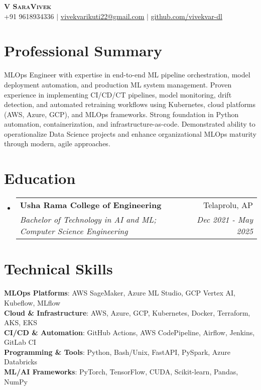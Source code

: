 \documentclass[letterpaper,11pt]{article}
\makeatletter
\newcommand{\resumeSubheading}[4]{
  \vspace{-2pt}\item
    \begin{tabular*}{0.97\textwidth}[t]{l@{\extracolsep{\fill}}r}
      \textbf{#1} & #2 \\
      \textit{\small#3} & \textit{\small #4} \\
    \end{tabular*}\vspace{-7pt}
}
\newcommand{\resumeSubHeadingListStart}{\begin{itemize}[leftmargin=0.15in, label={}]}
\newcommand{\resumeSubHeadingListEnd}{\end{itemize}}
\makeatother
\begin{document}
\begin{center}
    \textbf{\Huge \scshape V SaraVivek} \\ \vspace{1pt}
    \small +91 9618934336 $|$ \href{mailto:vivekvarikuti22@gmail.com}{\underline{vivekvarikuti22@gmail.com}} $|$ 
    \href{https://github.com/vivekvar-dl}{\underline{github.com/vivekvar-dl}}
\end{center}

\section{Professional Summary}
\begin{itemize}[leftmargin=0.15in, label={}]
    \small{\item{
        MLOps Engineer with expertise in end-to-end ML pipeline orchestration, model deployment automation, and production ML system management. Proven experience in implementing CI/CD/CT pipelines, model monitoring, drift detection, and automated retraining workflows using Kubernetes, cloud platforms (AWS, Azure, GCP), and MLOps frameworks. Strong foundation in Python automation, containerization, and infrastructure-as-code. Demonstrated ability to operationalize Data Science projects and enhance organizational MLOps maturity through modern, agile approaches.
    }}
\end{itemize}

\section{Education}
  \resumeSubHeadingListStart
    \resumeSubheading
      {Usha Rama College of Engineering}{Telaprolu, AP}
      {Bachelor of Technology in AI and ML; Computer Science Engineering}{Dec 2021 - May 2025}
  \resumeSubHeadingListEnd

\section{Technical Skills}
 \begin{itemize}[leftmargin=0.15in, label={}]
    \small{\item{
     \textbf{MLOps Platforms}{: AWS SageMaker, Azure ML Studio, GCP Vertex AI, Kubeflow, MLflow} \\
     \textbf{Cloud \& Infrastructure}{: AWS, Azure, GCP, Kubernetes, Docker, Terraform, AKS, EKS} \\
     \textbf{CI/CD \& Automation}{: GitHub Actions, AWS CodePipeline, Airflow, Jenkins, GitLab CI} \\
     \textbf{Programming \& Tools}{: Python, Bash/Unix, FastAPI, PySpark, Azure Databricks} \\
     \textbf{ML/AI Frameworks}{: PyTorch, TensorFlow, CUDA, Scikit-learn, Pandas, NumPy} \\
    }}
 \end{itemize}
\end{document}
